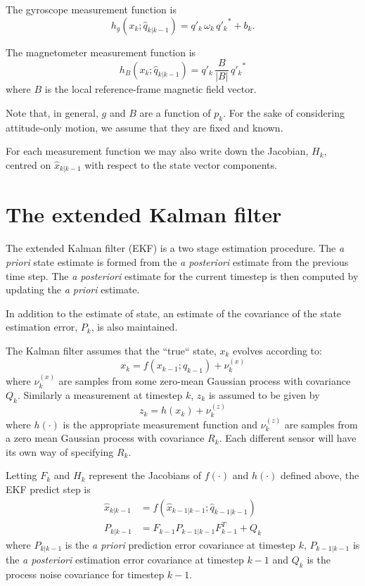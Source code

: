 \documentclass[a4paper]{paper}
\begin{document}
The gyroscope measurement function is
$$
h_g(x_k; \hat{q}_{k|k-1}) = q'_k \, \omega_k \, {q'_k}^* + b_k.
$$

The magnetometer measurement function is
$$
h_B(x_k;\hat{q}_{k|k-1}) = q'_k \, \frac{B}{|B|} \, {q'_k}^*
$$
where $B$ is the local reference-frame magnetic field vector.

Note that, in general, $g$ and $B$ are a function of $p_k$. For the sake of
considering attitude-only motion, we assume that they are fixed and known.

For each measurement function we may also write down the Jacobian, $H_k$,
centred on $\hat{x}_{k|k-1}$ with respect to the state vector components.

\section{The extended Kalman filter}

The extended Kalman filter (EKF) is a two stage estimation procedure. The
\emph{a priori} state estimate is formed from the \emph{a posteriori} estimate
from the previous time step. The \emph{a posteriori} estimate for the current
timestep is then computed by updating the \emph{a priori} estimate.

In addition to the estimate of state, an estimate of the covariance of the state
estimation error, $P_k$, is also maintained.

The Kalman filter assumes that the ``true`` state, $x_k$ evolves according to:
$$
x_k = f(x_{k-1}; q_{k-1}) + \nu^{(x)}_k
$$
where $\nu^{(x)}_k$ are samples from some zero-mean Gaussian process with
covariance $Q_k$. Similarly a measurement at timestep $k$, $z_k$ is assumed to
be given by
$$
z_k = h(x_k) + \nu^{(z)}_k
$$
where $h(\cdot)$ is the appropriate measurement function and $\nu^{(z)}_k$ are
samples from a zero mean Gaussian process with covariance $R_k$. Each different
sensor will have its own way of specifying $R_k$.

Letting $F_k$ and $H_k$ represent the Jacobians of $f(\cdot)$ and $h(\cdot)$
defined above, the EKF predict step is
\begin{align*}
	\hat{x}_{k|k-1} &= f(\hat{x}_{k-1|k-1}; \hat{q}_{k-1|k-1}) \\
	P_{k|k-1} &= F_{k-1} P_{k-1|k-1} F^T_{k-1} + Q_k
\end{align*}
where $P_{k|k-1}$ is the \emph{a priori} prediction error covariance at timestep
$k$, $P_{k-1|k-1}$ is the \emph{a posteriori} estimation error covariance at
timestep $k-1$ and $Q_k$ is the process noise covariance for timestep $k-1$.
\end{document}
